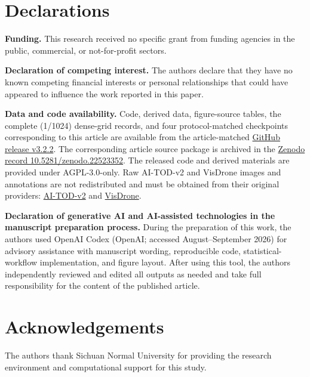 \printcredits

\section*{Declarations}

\noindent\textbf{Funding.}
This research received no specific grant from funding agencies in the public, commercial, or not-for-profit sectors.

\noindent\textbf{Declaration of competing interest.}
The authors declare that they have no known competing financial interests or personal relationships that could have appeared to influence the work reported in this paper.

\noindent\textbf{Data and code availability.}
Code, derived data, figure-source tables, the complete (1/1024) dense-grid records, and four protocol-matched checkpoints corresponding to this article are available from the article-matched \href{https://github.com/liuyede447/O2O_identity_audit/releases/tag/v3.2.2}{GitHub release v3.2.2}. The corresponding article source package is archived in the \href{https://doi.org/10.5281/zenodo.22523352}{Zenodo record 10.5281/zenodo.22523352}. The released code and derived materials are provided under AGPL-3.0-only. Raw AI-TOD-v2 and VisDrone images and annotations are not redistributed and must be obtained from their original providers: \href{https://github.com/Chasel-Tsui/AI-TOD-v2}{AI-TOD-v2} and \href{https://github.com/VisDrone/VisDrone-Dataset}{VisDrone}.

\noindent\textbf{Declaration of generative AI and AI-assisted technologies in the manuscript preparation process.}
During the preparation of this work, the authors used OpenAI Codex (OpenAI; accessed August--September 2026) for advisory assistance with manuscript wording, reproducible code, statistical-workflow implementation, and figure layout. After using this tool, the authors independently reviewed and edited all outputs as needed and take full responsibility for the content of the published article.

\section*{Acknowledgements}
The authors thank Sichuan Normal University for providing the research environment and computational support for this study.

\FloatBarrier
\renewcommand{\bibfont}{\fontsize{6.5pt}{7.2pt}\selectfont}
